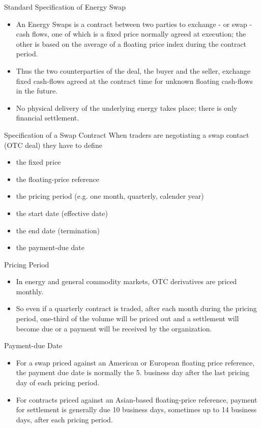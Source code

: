 {Standard Specification of Energy Swap}
\begin{itemize}
\item<1-> An Energy Swaps is a contract between two parties to exchange - or swap - cash flows, one of which is a fixed price normally agreed at execution; the other is based on the average of a floating price index during the contract period.
\item<2-> Thus the two counterparties of the deal, the buyer and the seller, exchange fixed cash-flows agreed at the contract time for unknown floating cash-flows in the future.
\item<3->
No physical delivery of the underlying energy takes place; there is only financial settlement.
\end{itemize}



{Specification of a Swap Contract}
When traders are negotiating a swap contact (OTC deal) they have to define
\begin{itemize}
  \item<1-> the fixed price
  \item<2-> the floating-price reference
  \item<3-> the pricing period (e.g. one month, quarterly, calender year)
  \item<4-> the start date (effective date)
  \item<5-> the end date (termination)
  \item<6-> the payment-due date
\end{itemize}



{Pricing Period}
\begin{itemize}
\item<1-> In energy and general commodity markets, OTC derivatives are priced monthly.
\item<2-> So even if a quarterly contract is traded, after each month during the pricing period, one-third of the volume will be priced out and a settlement will become due or a payment will be received by the organization.
\end{itemize}



{Payment-due Date}
\begin{itemize}
\item<1-> For a swap priced against an American or European floating price reference, the payment due date is normally the 5. business day after the last pricing day of each pricing period.
\item<2->
For contracts priced against an Asian-based floating-price reference, payment for settlement is generally due 10 business days, sometimes up to 14 business days, after each pricing period.
\end{itemize}


